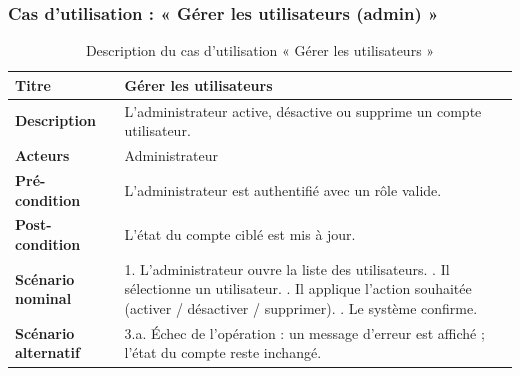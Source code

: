 \subsubsection{Cas d'utilisation : « Gérer les utilisateurs (admin) »}
\begin{table}[h!]
\centering
\renewcommand{\arraystretch}{1.3}
\begin{tabularx}{\textwidth}{|l|X|}
\hline
\textbf{Titre} & Gérer les utilisateurs \\ \hline
\textbf{Description} & L'administrateur active, désactive ou supprime un compte
utilisateur. \\ \hline
\textbf{Acteurs} & Administrateur \\ \hline
\textbf{Pré-condition} & L'administrateur est authentifié avec un rôle valide. \\ \hline
\textbf{Post-condition} & L'état du compte ciblé est mis à jour. \\ \hline
\textbf{Scénario nominal} &
1. L'administrateur ouvre la liste des utilisateurs. \newline
2. Il sélectionne un utilisateur. \newline
3. Il applique l'action souhaitée (activer / désactiver / supprimer). \newline
4. Le système confirme. \\ \hline
\textbf{Scénario alternatif} &
3.a. Échec de l'opération : un message d'erreur est affiché ; l'état du compte reste
inchangé. \\ \hline
\end{tabularx}
\caption{Description du cas d'utilisation « Gérer les utilisateurs »}
\end{table}

